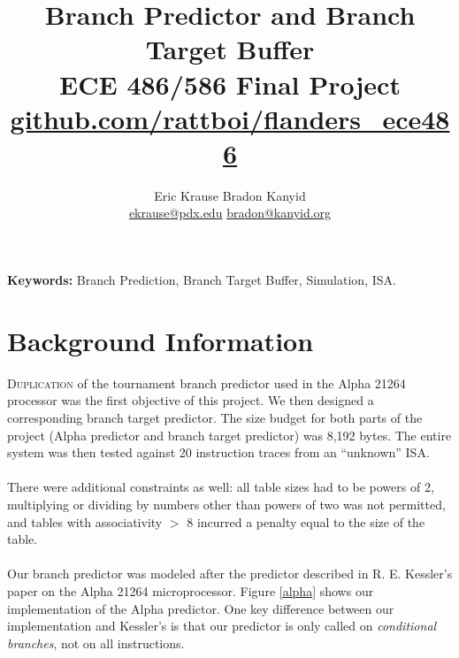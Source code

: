 \documentclass[twocolumn]{article}
\title{\textbf{Branch Predictor and Branch Target Buffer} \\
ECE 486/586 Final Project\\
\vspace{6pt}\large \url{github.com/rattboi/flanders_ece486} }
\author{Eric Krause \hspace{1.4in} Bradon Kanyid\\
\url{ekrause@pdx.edu} \hspace{1in} \url{bradon@kanyid.org}}
\begin{document}
\textbf{Keywords:} Branch Prediction, Branch Target Buffer, Simulation,  ISA.

\section{Background Information}
\lettrine{D}{uplication} of the tournament branch predictor used in the Alpha 21264 processor was the first objective of this project.  We then designed a corresponding branch target predictor.  The size budget for both parts of the project (Alpha predictor and branch target predictor) was 8,192 bytes.  The entire system was then tested against 20 instruction traces from an ``unknown'' ISA. \\\\
There were additional constraints as well: all table sizes had to be powers of 2, multiplying or dividing by numbers other than powers of two was not permitted, and tables with associativity $>$ 8 incurred a penalty equal to the size of the table.\\\\
Our branch predictor was modeled after the predictor described in R. E. Kessler's paper on the Alpha 21264 microprocessor.  Figure \ref{alpha} shows our implementation of the Alpha predictor.  One key difference between our implementation and Kessler's is that our predictor is only called on \textit{conditional branches}, not on all instructions.
\end{document}
